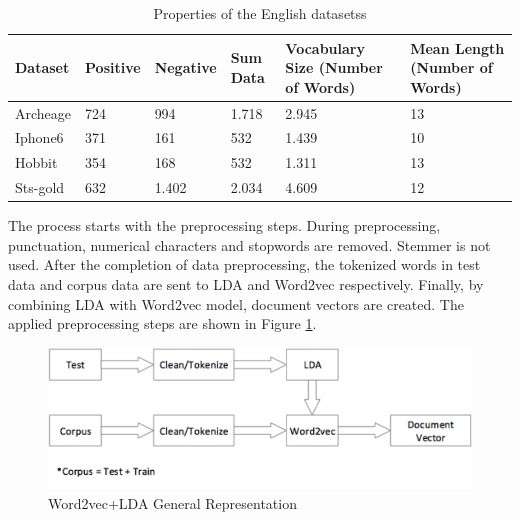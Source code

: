 \documentclass[a4paper,fleqn]{cas-dc}
\begin{document}
\begin{table}
		\caption{Properties of the English datasetss}	\label{tab2}
	\begin{tabular*}{\tblwidth}{ p{33pt}p{28pt}p{28pt}p{40pt}p{77pt}p{77pt} }
		\toprule
		\textbf{Dataset} & \textbf{Positive} & \textbf{Negative} & \textbf{Sum Data} & \textbf{\phantom{a} Vocabulary Size \phantom{a}  (Number of Words)} & \textbf{\phantom{aa}  Mean Length \phantom{aa} (Number of Words) } \\ 
		\midrule
		Archeage         & 724               & 994               & 1.718             & 2.945                                                                                & 13                                                                                          \\ 
		Iphone6          & 371               & 161               & 532               & 1.439                                                                                & 10                                                                                          \\ 
		Hobbit           & 354               & 168               & 532               & 1.311                                                                                & 13                                                                                          \\ 
		Sts-gold         & 632               & 1.402             & 2.034             & 4.609                                                                                & 12                                                                                          \\ 
		\bottomrule
	\end{tabular*}
\end{table}



The process starts with the preprocessing steps. During preprocessing, punctuation, numerical characters and stopwords are removed. Stemmer is not used. After the completion of data preprocessing, the tokenized words in test data and corpus data are sent to LDA and Word2vec respectively.  Finally, by combining LDA with Word2vec model, document vectors are created. The applied preprocessing steps are shown in Figure \ref{fig7}. 

\begin{figure}
	\centering
	\includegraphics[scale=.58]{figs/fig7.pdf}
	\caption{Word2vec+LDA General Representation}
	\label{fig7}
\end{figure}
\end{document}
